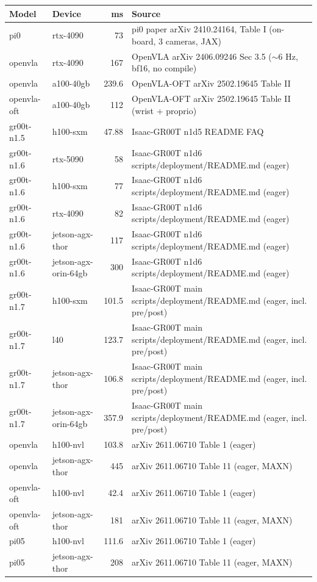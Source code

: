 {\small\setlength{\tabcolsep}{4pt}\begin{tabular}{llrp{9.2cm}}
\toprule
Model & Device & ms & Source \\
\midrule
pi0 & rtx-4090 & 73 & pi0 paper arXiv 2410.24164, Table I (on-board, 3 cameras, JAX) \\
openvla & rtx-4090 & 167 & OpenVLA arXiv 2406.09246 Sec 3.5 ($\sim$6 Hz, bf16, no compile) \\
openvla & a100-40gb & 239.6 & OpenVLA-OFT arXiv 2502.19645 Table II \\
openvla-oft & a100-40gb & 112 & OpenVLA-OFT arXiv 2502.19645 Table II (wrist + proprio) \\
gr00t-n1.5 & h100-sxm & 47.88 & Isaac-GR00T n1d5 README FAQ \\
gr00t-n1.6 & rtx-5090 & 58 & Isaac-GR00T n1d6 scripts/deployment/README.md (eager) \\
gr00t-n1.6 & h100-sxm & 77 & Isaac-GR00T n1d6 scripts/deployment/README.md (eager) \\
gr00t-n1.6 & rtx-4090 & 82 & Isaac-GR00T n1d6 scripts/deployment/README.md (eager) \\
gr00t-n1.6 & jetson-agx-thor & 117 & Isaac-GR00T n1d6 scripts/deployment/README.md (eager) \\
gr00t-n1.6 & jetson-agx-orin-64gb & 300 & Isaac-GR00T n1d6 scripts/deployment/README.md (eager) \\
gr00t-n1.7 & h100-sxm & 101.5 & Isaac-GR00T main scripts/deployment/README.md (eager, incl. pre/post) \\
gr00t-n1.7 & l40 & 123.7 & Isaac-GR00T main scripts/deployment/README.md (eager, incl. pre/post) \\
gr00t-n1.7 & jetson-agx-thor & 106.8 & Isaac-GR00T main scripts/deployment/README.md (eager, incl. pre/post) \\
gr00t-n1.7 & jetson-agx-orin-64gb & 357.9 & Isaac-GR00T main scripts/deployment/README.md (eager, incl. pre/post) \\
openvla & h100-nvl & 103.8 & arXiv 2611.06710 Table 1 (eager) \\
openvla & jetson-agx-thor & 445 & arXiv 2611.06710 Table 11 (eager, MAXN) \\
openvla-oft & h100-nvl & 42.4 & arXiv 2611.06710 Table 1 (eager) \\
openvla-oft & jetson-agx-thor & 181 & arXiv 2611.06710 Table 11 (eager, MAXN) \\
pi05 & h100-nvl & 111.6 & arXiv 2611.06710 Table 1 (eager) \\
pi05 & jetson-agx-thor & 208 & arXiv 2611.06710 Table 11 (eager, MAXN) \\

\end{tabular}}
